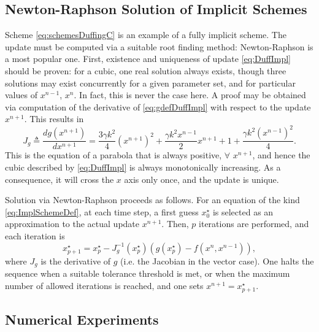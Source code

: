 \documentclass[11pt,twoside,a4paper,english]{book}
\begin{document}
\subsection{Newton-Raphson Solution of Implicit Schemes}

Scheme \eqref{eq:schemesDuffingC} is an example of a fully implicit scheme. The update must be computed via a suitable root finding method: Newton-Raphson is a most popular one. First, existence and uniqueness of update \eqref{eq:DuffImpl} should be proven: for a cubic, one real solution always exists, though three solutions may exist concurrently for a given parameter set, and for particular values of $x^{n-1}$, $x^n$. In fact, this is never the case here. A proof may be obtained via computation of the derivative of \eqref{eq:gdefDuffImpl} with respect to the update $x^{n+1}$. This results in
\begin{equation}
J_g \triangleq \frac{d g(x^{n+1})}{d x^{n+1}} = \frac{3\gamma k^2}{4}(x^{n+1})^2 + \frac{\gamma k^2 x^{n-1}}{2}x^{n+1} + 1 + \frac{\gamma k^2 (x^{n-1})^2}{4}.
\end{equation}
This is the equation of a parabola that is always positive, $\forall$ $x^{n+1}$, and hence the cubic described by \eqref{eq:DuffImpl} is always monotonically increasing. As a consequence, it will cross the $x$ axis only once, and the update is unique.

Solution via Newton-Raphson proceeds as follows. For an equation of the kind \eqref{eq:ImplSchemeDef}, at each time step, a first guess $x^\star_0$ is selected as an approximation to the actual update $x^{n+1}$. Then, $p$ iterations are performed, and each iteration is 
\begin{equation}
x^{\star}_{p+1} = x^{\star}_{p} - J_g^{-1}(x^{\star}_{p})\left(g(x^{\star}_{p}) - f(x^n,x^{n-1})\right),
\end{equation}
where $J_g$ is the derivative of $g$ (i.e. the Jacobian in the vector case). One halts the sequence when a suitable tolerance threshold is met, or when the maximum number of allowed iterations is reached, and one sets $x^{n+1}=x^\star_{p+1}$.



\subsection{Numerical Experiments}
\end{document}
